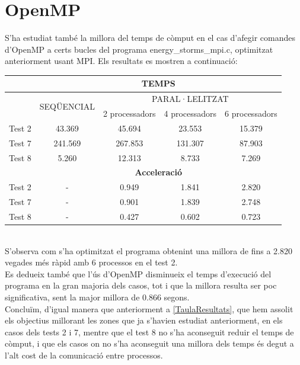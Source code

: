 \documentclass[a4paper, 11pt]{article}
\begin{document}
\section{OpenMP}
S'ha estudiat també la millora del temps de còmput en el cas d'afegir comandes d'OpenMP a certs bucles del programa \textcolor{darkpastelgreen}{energy\_storms\_mpi.c}, optimitzat anteriorment usant MPI. Els resultats es mostren a continuació:
\begin{table}[h]
  \centering
  \begin{tabular}{l||c||c|c|c}
        \multirow{3}{*}{\cellcolor{black}{}} & \multicolumn{4}{c}{\textbf{TEMPS}}\\\hline
        \cellcolor{black}{} & \multirow{2}{*}{SEQÜENCIAL} & \multicolumn{3}{c}{PARAL·LELITZAT}\\ 
        \cellcolor{black}{} &  & 2 processadors & 4 processadors & 6 processadors \\\hline\hline
        Test 2 & 43.369 & 45.694 & 23.553 & 15.379 \\\hline
        Test 7 & 241.569 & 267.853 & 131.307 & 87.903 \\\hline
        Test 8 & 5.260 & 12.313 & 8.733 & 7.269 \\\hline\hline
        \cellcolor{black}{} & \multicolumn{4}{c}{\textbf{Acceleració}} \\\hline\hline
        Test 2 & - & 0.949 & 1.841 & 2.820 \\\hline
        Test 7 & - & 0.901 & 1.839 & 2.748 \\\hline
        Test 8 & - & 0.427 & 0.602 & 0.723 \\
    \end{tabular}
\end{table}
\hspace{-1.5 em}\\S'observa com s'ha optimitzat el programa obtenint una millora de fins a 2.820 vegades més ràpid amb 6 processos en el test 2.\\
Es dedueix també que l'ús d'OpenMP disminueix el temps d'execució del programa en la gran majoria dels casos, tot i que la millora resulta ser poc significativa, sent la major millora de 0.866 segons.\\
Concluïm, d'igual manera que anteriorment a \textcolor{blue}{\ref{TaulaResultats}}, que hem assolit els objectius millorant les zones que ja s'havien estudiat anteriorment, en els casos dels tests 2 i 7, mentre que el test 8 no s'ha aconseguit reduir el temps de còmput, i que els casos on no s'ha aconseguit una millora dels temps és degut a l'alt cost de la comunicació entre processos.\\
\newpage
\end{document}
